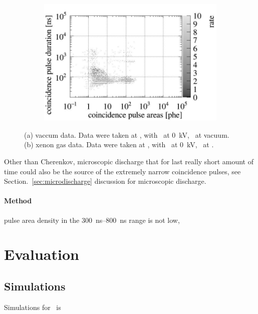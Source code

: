 \begin{figure}[!p]
	\begin{subfigure}[b]{\textwidth}
	\centering
	\includegraphics[width=\figurewidth,clip,trim={0 0 0 0}]{Figures/GasTest/CutsValid/all65831.jpg}
	\caption{}
	\label{fig:Chrenkov c}
\end{subfigure}
	\caption[\gtest\ extremely narrow event: coincidence \pud\ vs coincidence pulse area]{(a) vaccum data. Data were taken at , with \opvtvb\ at \SI{0}{\kV}, \opgd\ at vacuum. (b) xenon gas data. Data were taken at , with \opvtvb\ at \SI{0}{\kV}, \opgd\ at \standarddensity .
}
\label{fig:ChrenkovCompare}

\end{figure}

Other than Cherenkov, microscopic discharge that for last really short amount of time could also be the source of the extremely narrow coincidence pulses, see Section.~\ref{sec:microdischarge} discussion for microscopic discharge.  

\paragraph{Method}



pulse area density in the \SIrange{300}{800}{\ns} range is not low, 


\section{Evaluation}
\subsection{Simulations}
Simulations for \eep\ is

